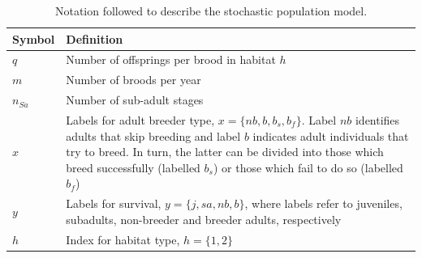 \begin{table}
\caption[Notation]{Notation followed to describe the stochastic population
model.}\label{tab:table3.1}
\begin{tabular}[b]{@{}p{1.5cm}p{13cm}@{}}
\toprule
\textbf{Symbol} & \textbf{Definition}                                                                                                                                                                                                                                                                                        \\ \midrule
$q$   & Number of offsprings per brood in habitat $h$                                                                                                                                                                                                                                                                        \\
$m$   & Number of broods per year                                                                                                                                                                                                                                                                                            \\
${n}_{Sa}$        & Number of sub-adult stages                                                                                                                                                                                                                                                                               \\
$x$   & Labels for adult breeder type, $x= \{nb, b, b_{s}, b_{f}\}$. Label $nb$ identifies adults that skip breeding and label $b$ indicates adult individuals that try to breed. In turn, the latter can be divided into those which breed successfully (labelled $b_{s}$) or those which fail to do so (labelled $b_{f}$)  \\
$y$   & Labels for survival, $y= \{j, sa, nb, b\}$, where labels refer to juveniles, subadults, non-breeder and breeder adults, respectively                                                                                                                                                                                 \\
$h$   & Index for habitat type, $h= \{1, 2\}$                                                                                                                                                                                                                                                                                \\

\end{tabular}
\end{table}
